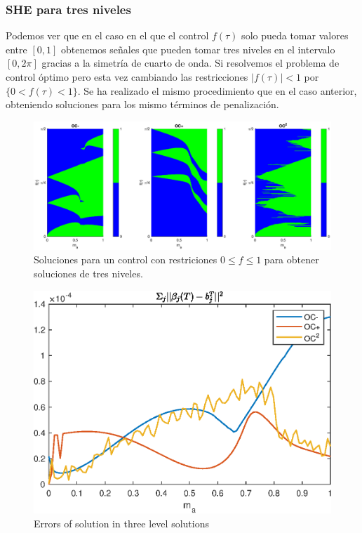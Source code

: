 \subsubsection{SHE para tres niveles}

Podemos ver que en el caso en el que el control $f(\tau)$ solo pueda tomar valores entre $[0,1]$ obtenemos señales que pueden tomar tres niveles en el intervalo $[0,2\pi]$ gracias a la simetría de cuarto de onda. Si resolvemos el problema de control óptimo pero esta vez cambiando las restricciones $|f(\tau)|<1$ por $\{0<f(\tau)<1\}$. Se ha realizado el mismo procedimiento que en el caso anterior, obteniendo soluciones para los mismo términos de penalización.

\begin{figure}
    \centering
    \includegraphics[scale=0.45]{img/EX01_surf_3LVL.eps}
    \caption{Soluciones para un control  con restriciones $0 \leq f\leq 1$ para obtener soluciones de tres niveles.}
\end{figure}

\begin{figure}
    \centering
    \includegraphics[scale=0.7]{img/EX01_3LVL.eps}
    \caption{Errors of solution in three level solutions}
\end{figure}
 
  